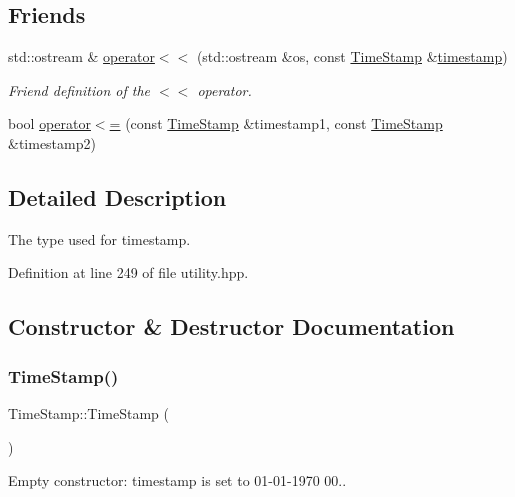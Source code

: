 \subsection*{Friends}
\begin{DoxyCompactItemize}
\item 
std\+::ostream \& \hyperlink{structTimeStamp_aa1f9c4e19c39c0bd0df700360d40312d}{operator$<$$<$} (std\+::ostream \&os, const \hyperlink{structTimeStamp}{Time\+Stamp} \&\hyperlink{structTimeStamp_aabadfe55a07e911a3a255fb59cfff993}{timestamp})
\begin{DoxyCompactList}\small\item\em Friend definition of the $<$$<$ operator. \end{DoxyCompactList}\item 
bool \hyperlink{structTimeStamp_aed26d55642f1d3428d843e7997d4983e}{operator$<$=} (const \hyperlink{structTimeStamp}{Time\+Stamp} \&timestamp1, const \hyperlink{structTimeStamp}{Time\+Stamp} \&timestamp2)
\end{DoxyCompactItemize}


\subsection{Detailed Description}
The type used for timestamp. 

Definition at line 249 of file utility.\+hpp.



\subsection{Constructor \& Destructor Documentation}
\mbox{\label{structTimeStamp_a130d6c5230be88ae97c3db1ca9362b97}} 
\subsubsection{\texorpdfstring{Time\+Stamp()}{TimeStamp()}\hspace{0.1cm}{\footnotesize\ttfamily [1/2]}}
{\footnotesize\ttfamily Time\+Stamp\+::\+Time\+Stamp (\begin{DoxyParamCaption}{ }\end{DoxyParamCaption})}



Empty constructor\+: timestamp is set to 01-\/01-\/1970 00.. 



